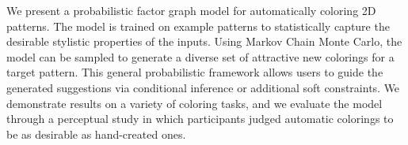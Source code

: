 We present a probabilistic factor graph model for automatically coloring 2D patterns. The model is trained on example patterns to statistically capture the desirable stylistic properties of the inputs. Using Markov Chain Monte Carlo, the model can be sampled to generate a diverse set of attractive new colorings for a target pattern. This general probabilistic framework allows users to guide the generated suggestions via conditional inference or additional soft constraints. We demonstrate results on a variety of coloring tasks, and we evaluate the model through a perceptual study in which participants judged automatic colorings to be as desirable as hand-created ones.